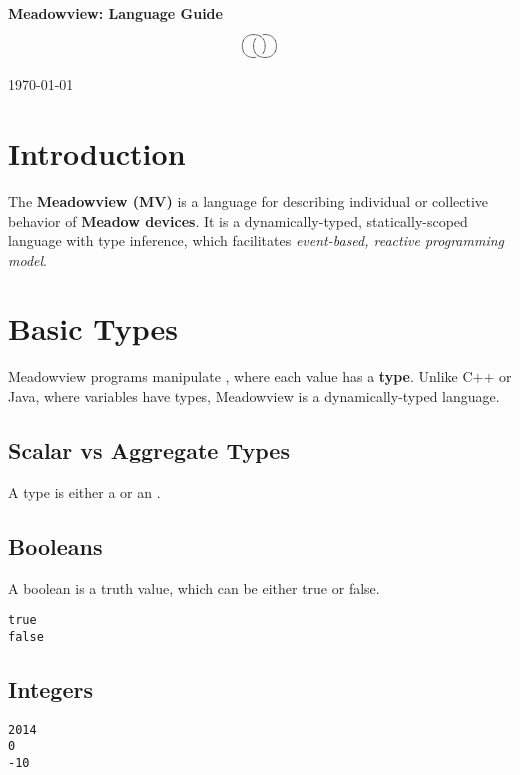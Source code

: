 \documentclass{note}\usepackage{mathptm,mydef}
\begin{document}
\small

\begin{center}
\textcolor{blue2}{\large\bf Meadowview: Language Guide}
\\
$$\xy
\xygraph{!{0;/r0.7pc/:} !{\vover}[u]
  !{\hcap[-2]} [d] !{\vover-} [ruu] !{\hcap[2]}}
\endxy$$

\vspace*{0.8cm}

{\small\today}

\vspace*{0.8cm}

\end{center}



\section{Introduction}
\noindent{}The \textcolor{blue2}{\bf{}Meadowview (MV)} is a language for
describing individual or collective behavior of \textcolor{blue2}{\bf{}Meadow
  devices}. 
It is a dynamically-typed, statically-scoped language with type inference,
which facilitates {\em event-based, reactive programming model\/}.

\section{Basic Types}
\noindent{}Meadowview programs manipulate , where
{each value has a {\bf type}\/}. Unlike C++ or Java, where
variables have types, Meadowview is a dynamically-typed language.

\subsection{Scalar vs Aggregate Types}
A type is either a  or an .


\subsection{Booleans}
A boolean is a truth value, which can be either true or false.
\begin{alltt}
  \textcolor{red2}{true
  false}
\end{alltt}

\subsection{Integers}
\begin{alltt}
  \textcolor{red2}{2014  
  0
  -10}
\end{alltt}
\end{document}

